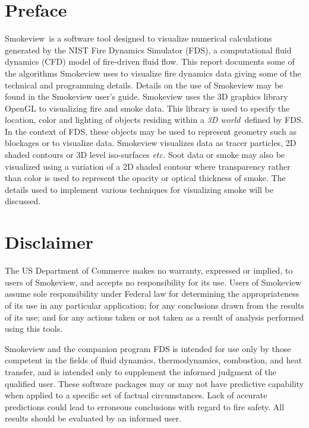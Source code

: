 \documentclass[11pt,twoside]{book}
\newcommand{\fds}{{FDS}}
\newcommand{\Smokeview}{{Smokeview}}
\begin{document}
\chapter{Preface}
\Smokeview\ is a software tool designed to visualize numerical
calculations generated by the NIST Fire Dynamics Simulator (\fds),
a computational fluid dynamics (CFD) model of fire-driven fluid
flow. This report documents some of the algorithms Smokeview uses to visualize fire dynamics data giving some of the technical and programming details.
Details on the use of Smokeview may be found in the Smokeview user's
guide.
Smokeview uses the 3D graphics library OpenGL to visualizing fire and smoke data.
This library is
used to specify the location, color and
lighting of objects residing within a {\em 3D world}\ defined by FDS.
In the context of FDS, these objects
may be used to represent geometry such as blockages or to
visualize data. Smokeview visualizes data as tracer particles, 2D
shaded contours or 3D level iso-surfaces {\em etc.}  Soot data or
smoke may also be visualized using a variation of a 2D shaded
contour where transparency rather than color is used to represent
the opacity or optical thickness of smoke.  The details used to implement various
techniques for visualizing smoke will be discussed.


%
%

\chapter{Disclaimer}

The US Department of Commerce makes no warranty,
expressed or implied, to users of Smokeview, and accepts no
responsibility for its use. Users of Smokeview assume sole
responsibility under Federal law for determining the
appropriateness of its use in any particular application; for any
conclusions drawn from the results of its use; and for any actions
taken or not taken as a result of analysis performed using this
tools.

Smokeview and the companion program FDS is intended for use only
by those competent in the fields of fluid dynamics,
thermodynamics, combustion, and heat transfer, and is intended
only to supplement the informed judgment of the qualified user.
These software packages may or may not have predictive capability
when applied to a specific set of factual circumstances. Lack of
accurate predictions could lead to erroneous conclusions with
regard to fire safety. All results should be evaluated by an
informed user.
\end{document}
